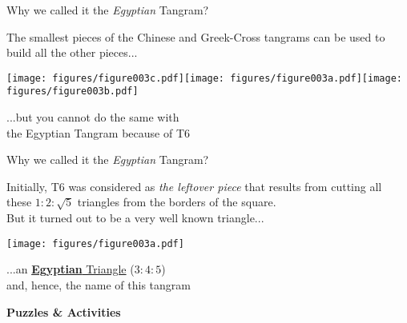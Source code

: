 \documentclass[14pt]{beamer}
\begin{document}

        \begin{frame}{Why we called it the \emph{Egyptian} Tangram?}
        \begin{center}
            The smallest pieces of the Chinese and Greek-Cross tangrams can be used to build all the other pieces...

            \bigskip \bigskip

            \texttt{[image: figures/figure003c.pdf]}\quad\texttt{[image: figures/figure003a.pdf]}\quad\texttt{[image: figures/figure003b.pdf]} \\

            \bigskip \bigskip

            ...but you cannot do the same with\\the Egyptian Tangram because of T6
        \end{center}
    \end{frame}


    \begin{frame}{Why we called it the \emph{Egyptian} Tangram?}
        \begin{center}
            {\small Initially, T6 was considered as \emph{the leftover piece} that results from cutting all these $1\!\!:\!\!2\!\!:\!\!\sqrt{5}$ triangles from the borders of the square.\\But it turned out to be a very well known triangle...}

            \bigskip \bigskip

            \texttt{[image: figures/figure003a.pdf]} \\

            \bigskip \bigskip

            ...an \href{https://en.wikipedia.org/wiki/Rope_stretcher}{\textbf{Egyptian} Triangle} ($3\!\!:\!\!4\!\!:\!\!5$)\\{\small and, hence, the name of this tangram}
        \end{center}
    \end{frame}


    \begin{frame}{}
        \begin{center}
            \textbf{\Huge Puzzles \& Activities}\\
        \end{center}
    \end{frame}
\end{document}
